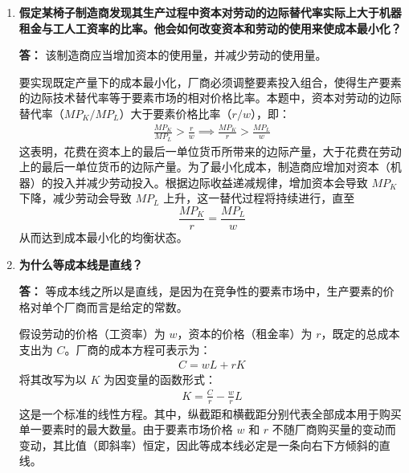 \begin{enumerate}[label=\textbf{\arabic*.}, leftmargin=*]
		\textbf{答：}
		劳动的边际产出（$MP_L$）将呈现递增趋势。
		
		短期生产中，边际成本（$MC$）是指增加一单位产量所引起的总成本的增加量。由于劳动是唯一的可变要素，增加产量所需的额外成本即为雇佣额外劳动的成本。根据边际成本与边际产出的对偶关系公式：
		\[
		\begin{aligned}
			MC = \frac{\Delta VC}{\Delta Q} = \frac{w \cdot \Delta L}{\Delta Q} = \frac{w}{MP_L}
		\end{aligned}
		\]
		在要素市场工资率 $w$ 给定的假设下，$MC$ 与 $MP_L$ 成严格的反比关系。如果边际成本 $MC$ 随产量增加而下降，意味着生产每一单位新增产量所需的额外劳动投入在不断减少，因此劳动的边际产出 $MP_L$ 必然是递增的。
		
		\item \textbf{假定某椅子制造商发现其生产过程中资本对劳动的边际替代率实际上大于机器租金与工人工资率的比率。他会如何改变资本和劳动的使用来使成本最小化？}
		
		\textbf{答：}
		该制造商应当增加资本的使用量，并减少劳动的使用量。
		
		要实现既定产量下的成本最小化，厂商必须调整要素投入组合，使得生产要素的边际技术替代率等于要素市场的相对价格比率。本题中，资本对劳动的边际替代率（$MP_K / MP_L$）大于要素价格比率（$r / w$），即：
		\[
		\begin{aligned}
			\frac{MP_K}{MP_L} > \frac{r}{w} \implies \frac{MP_K}{r} > \frac{MP_L}{w}
		\end{aligned}
		\]
		这表明，花费在资本上的最后一单位货币所带来的边际产量，大于花费在劳动上的最后一单位货币的边际产量。为了最小化成本，制造商应增加对资本（机器）的投入并减少劳动投入。根据边际收益递减规律，增加资本会导致 $MP_K$ 下降，减少劳动会导致 $MP_L$ 上升，这一替代过程将持续进行，直至
		$$\frac{MP_K}{r} = \frac{MP_L}{w}$$
		从而达到成本最小化的均衡状态。
		
		\item \textbf{为什么等成本线是直线？}
		
		\textbf{答：}
		等成本线之所以是直线，是因为在竞争性的要素市场中，生产要素的价格对单个厂商而言是给定的常数。
		
		假设劳动的价格（工资率）为 $w$，资本的价格（租金率）为 $r$，既定的总成本支出为 $C$。厂商的成本方程可表示为：
		\[
		\begin{aligned}
			C = wL + rK
		\end{aligned}
		\]
		将其改写为以 $K$ 为因变量的函数形式：
		\[
		\begin{aligned}
			K = \frac{C}{r} - \frac{w}{r}L
		\end{aligned}
		\]
		这是一个标准的线性方程。其中，纵截距和横截距分别代表全部成本用于购买单一要素时的最大数量。由于要素市场价格 $w$ 和 $r$ 不随厂商购买量的变动而变动，其比值（即斜率）恒定，因此等成本线必定是一条向右下方倾斜的直线。
		

\end{enumerate}
